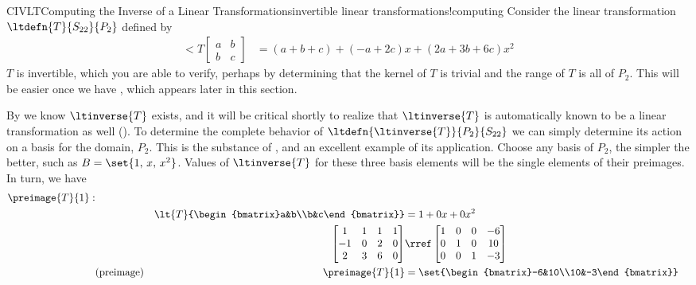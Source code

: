 %
\begin{example}{CIVLT}{Computing the Inverse of a Linear Transformations}{invertible linear transformations!computing}
%
Consider the linear transformation  $\ltdefn{T}{S_{22}}{P_2}$ defined by
%
\begin{align*}
\lt{T}{\begin{bmatrix}a&b\\b&c\end{bmatrix}}
&=
\left(a+b+c\right)
+
\left(-a+2c\right)x
+
\left(2a+3b+6c\right)x^2
\end{align*}
%
$T$ is invertible, which you are able to verify, perhaps by determining that the kernel of $T$ is trivial and the range of $T$ is all of $P_2$.  This will be easier once we have , which appears later in this section.\par
%
By  we know $\ltinverse{T}$ exists, and it will be critical shortly to realize that $\ltinverse{T}$ is automatically known to be a linear transformation as well ().  To determine the complete behavior of $\ltdefn{\ltinverse{T}}{P_2}{S_{22}}$ we can simply determine its action on a basis for the domain, $P_2$.  This is the substance of , and an excellent example of its application.   Choose any basis of $P_2$, the simpler the better, such as $B=\set{1,\,x,\,x^2}$.  Values of $\ltinverse{T}$ for these three basis elements will be the single elements of their preimages.  In turn, we have
%
\begin{align*}
\preimage{T}{1}:&\\
&&\lt{T}{\begin{bmatrix}a&b\\b&c\end{bmatrix}}
&=1+0x+0x^2\\
%
&&\begin{bmatrix}
 1 & 1 & 1 & 1\\
 -1 & 0 & 2 & 0\\
 2 & 3 & 6 & 0
\end{bmatrix}
&\rref
\begin{bmatrix}
1 & 0 & 0& -6 \\
0 & 1 & 0& 10 \\
0 & 0 & 1& -3
\end{bmatrix}
\\
&\text{(preimage)}&\preimage{T}{1}
&=\set{\begin{bmatrix}-6&10\\10&-3\end{bmatrix}}\\

\end{align*}
\end{example}
